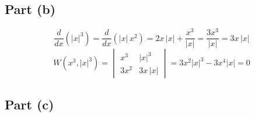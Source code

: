 \documentclass{article}
\begin{document}
\subsection*{Part (b)}
\[\frac{d}{dx}\left(|x|^3\right)=\frac{d}{dx}\left(|x|\,x^2\right)=2x\,|x|+\frac{x^3}{|x|}=\frac{3x^3}{|x|}=3x\,|x|\]
\[W\left(x^3,|x|^3\right)=
\begin{vmatrix}
	x^3 & |x|^3 \\
	3x^2 & 3x\,|x|
\end{vmatrix}
=3x^2|x|^3-3x^4|x|=\boxed{0}\]
\subsection*{Part (c)}
\end{document}
